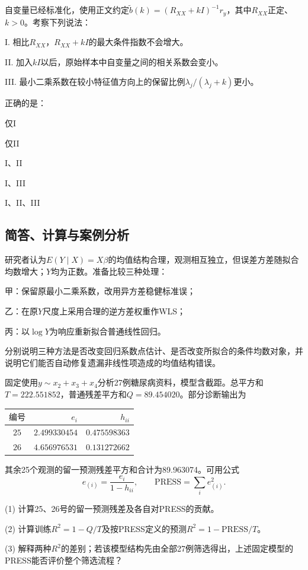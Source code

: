 \par\noindent\begin{minipage}{\linewidth}
自变量已经标准化，使用正文约定$\widetilde b(k)=(R_{XX}+kI)^{-1}r_y$，其中$R_{XX}$正定、$k>0$。考察下列说法：\par I. 相比$R_{XX}$，$R_{XX}+kI$的最大条件指数不会增大。\par II. 加入$kI$以后，原始样本中自变量之间的相关系数会变小。\par III. 最小二乘系数在较小特征值方向上的保留比例$\lambda_j/(\lambda_j+k)$更小。\par 正确的是：
\begin{choices}
\item 仅I
\item 仅II
\item I、II
\item I、III
\item I、II、III
\end{choices}
\end{minipage}\par\medskip

\subsection{简答、计算与案例分析}

研究者认为$E(Y\mid X)=X\beta$的均值结构合理，观测相互独立，但误差方差随拟合均数增大；$Y$均为正数。准备比较三种处理：\par 甲：保留原最小二乘系数，改用异方差稳健标准误；\par 乙：在原$Y$尺度上采用合理的逆方差权重作WLS；\par 丙：以$\log Y$为响应重新拟合普通线性回归。\par 分别说明三种方法是否改变回归系数点估计、是否改变所拟合的条件均数对象，并说明它们能否自动修复遗漏非线性项造成的均值结构错误。

固定使用$y\sim x_2+x_3+x_4$分析27例糖尿病资料，模型含截距。总平方和$T=222.551852$，普通残差平方和$Q=89.454020$。部分诊断输出为\begin{center}\small\setlength{\tabcolsep}{5pt}
\begin{tabular}{crr}
\toprule
$\text{编号}$ & $e_i$ & $h_{ii}$ \\
\midrule
$25$ & $2.499330454$ & $0.475598363$ \\
$26$ & $4.656976531$ & $0.131272662$ \\
\bottomrule
\end{tabular}
\end{center}其余25个观测的留一预测残差平方和合计为89.963074。可用公式\[e_{(i)}=\frac{e_i}{1-h_{ii}},\qquad \mathrm{PRESS}=\sum_i e_{(i)}^2.\]\par (1) 计算25、26号的留一预测残差及各自对PRESS的贡献。\par (2) 计算训练$R^2=1-Q/T$及按PRESS定义的预测$R^2=1-\mathrm{PRESS}/T$。\par (3) 解释两种$R^2$的差别；若该模型结构先由全部27例筛选得出，上述固定模型的PRESS能否评价整个筛选流程？

